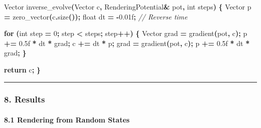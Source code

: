 \documentclass[
  11pt,
  a4paper,
]{article}
\newenvironment{Shaded}{\begin{snugshade}}{\end{snugshade}}
\newcommand{\BuiltInTok}[1]{#1}
\newcommand{\CommentTok}[1]{\textcolor[rgb]{0.56,0.35,0.01}{\textit{#1}}}
\newcommand{\ControlFlowTok}[1]{\textcolor[rgb]{0.13,0.29,0.53}{\textbf{#1}}}
\newcommand{\DataTypeTok}[1]{\textcolor[rgb]{0.13,0.29,0.53}{#1}}
\newcommand{\DecValTok}[1]{\textcolor[rgb]{0.00,0.00,0.81}{#1}}
\newcommand{\FloatTok}[1]{\textcolor[rgb]{0.00,0.00,0.81}{#1}}
\newcommand{\NormalTok}[1]{#1}
\newcommand{\OperatorTok}[1]{\textcolor[rgb]{0.81,0.36,0.00}{\textbf{#1}}}
\begin{document}
\begin{Shaded}
\begin{Highlighting}[]
\NormalTok{Vector inverse\_evolve}\OperatorTok{(}\NormalTok{Vector c}\OperatorTok{,}\NormalTok{ RenderingPotential}\OperatorTok{\&}\NormalTok{ pot}\OperatorTok{,} \DataTypeTok{int}\NormalTok{ steps}\OperatorTok{)} \OperatorTok{\{}
\NormalTok{    Vector p }\OperatorTok{=}\NormalTok{ zero\_vector}\OperatorTok{(}\NormalTok{c}\OperatorTok{.}\NormalTok{size}\OperatorTok{());}
    \DataTypeTok{float}\NormalTok{ dt }\OperatorTok{=} \OperatorTok{{-}}\FloatTok{0.01}\BuiltInTok{f}\OperatorTok{;}  \CommentTok{// Reverse time}
    
    \ControlFlowTok{for} \OperatorTok{(}\DataTypeTok{int}\NormalTok{ step }\OperatorTok{=} \DecValTok{0}\OperatorTok{;}\NormalTok{ step }\OperatorTok{\textless{}}\NormalTok{ steps}\OperatorTok{;}\NormalTok{ step}\OperatorTok{++)} \OperatorTok{\{}
\NormalTok{        Vector grad }\OperatorTok{=}\NormalTok{ gradient}\OperatorTok{(}\NormalTok{pot}\OperatorTok{,}\NormalTok{ c}\OperatorTok{);}
\NormalTok{        p }\OperatorTok{+=} \FloatTok{0.5}\BuiltInTok{f} \OperatorTok{*}\NormalTok{ dt }\OperatorTok{*}\NormalTok{ grad}\OperatorTok{;}
\NormalTok{        c }\OperatorTok{+=}\NormalTok{ dt }\OperatorTok{*}\NormalTok{ p}\OperatorTok{;}
\NormalTok{        grad }\OperatorTok{=}\NormalTok{ gradient}\OperatorTok{(}\NormalTok{pot}\OperatorTok{,}\NormalTok{ c}\OperatorTok{);}
\NormalTok{        p }\OperatorTok{+=} \FloatTok{0.5}\BuiltInTok{f} \OperatorTok{*}\NormalTok{ dt }\OperatorTok{*}\NormalTok{ grad}\OperatorTok{;}
    \OperatorTok{\}}
    
    \ControlFlowTok{return}\NormalTok{ c}\OperatorTok{;}
\OperatorTok{\}}
\end{Highlighting}
\end{Shaded}

\begin{center}\rule{0.5\linewidth}{0.5pt}\end{center}

\subsubsection{8. Results}\label{results-1}

\paragraph{8.1 Rendering from Random
States}\label{rendering-from-random-states}
\end{document}
